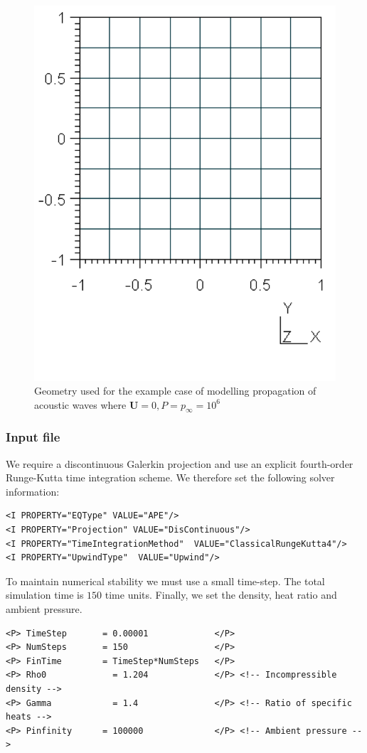 \begin{figure}
	\centering
	\includegraphics[width=0.5\linewidth]{Figures/APE_Geometry.png}
	\caption{Geometry used for the example case of modelling propagation of
	acoustic waves where $\mathbf{U}=0, P=p_{\infty}=10^6$}
	\label{f:apesolver:geometry}
\end{figure}

\subsubsection{Input file}
We require a discontinuous Galerkin projection and use an explicit
fourth-order Runge-Kutta time integration scheme. We therefore set the following
solver information:
\begin{lstlisting}[style=XmlStyle]
<I PROPERTY="EQType" VALUE="APE"/> 
<I PROPERTY="Projection" VALUE="DisContinuous"/>
<I PROPERTY="TimeIntegrationMethod"  VALUE="ClassicalRungeKutta4"/>
<I PROPERTY="UpwindType"  VALUE="Upwind"/> 
\end{lstlisting}

To maintain numerical stability we must use a small time-step. The total
simulation time is $150$ time units. Finally, we set the density, heat ratio and
ambient pressure.
\begin{lstlisting}[style=XMLStyle]
<P> TimeStep       = 0.00001             </P>
<P> NumSteps       = 150                 </P>
<P> FinTime        = TimeStep*NumSteps   </P>
<P> Rho0             = 1.204             </P> <!-- Incompressible density -->
<P> Gamma            = 1.4               </P> <!-- Ratio of specific heats -->
<P> Pinfinity      = 100000              </P> <!-- Ambient pressure -->
\end{lstlisting}

